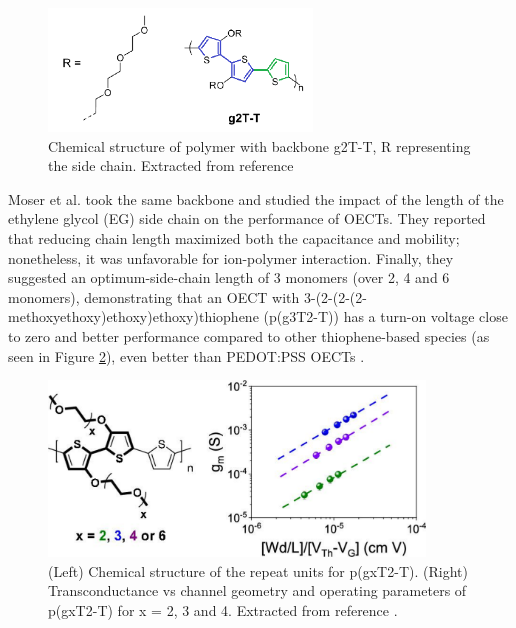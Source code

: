 \begin{figure}[h]
	\centering
	\includegraphics[width=7cm]{Images/pdf/g2T-T.pdf}
	\caption[Chemical structure of polymer g2T-T]{Chemical structure of polymer with backbone g2T-T, R representing the side chain. Extracted from reference \cite{nielsenMolecularDesignSemiconducting2016}}
	\label{fig:g2TT}
\end{figure}

Moser et al. took the same backbone and studied the impact of the length of the ethylene glycol (EG) side chain on the performance of OECTs. They reported that reducing chain length maximized both the capacitance and mobility; nonetheless, it was unfavorable for ion-polymer interaction. Finally, they suggested an optimum-side-chain length of 3 monomers (over 2, 4 and 6 monomers), demonstrating that an OECT with 3-(2-(2-(2-methoxyethoxy)ethoxy)ethoxy)thiophene (p(g3T2-T)) has a turn-on voltage close to zero and better performance compared to other thiophene-based species (as seen in Figure \ref{fig:pg3t}), even better than PEDOT:PSS OECTs %
\cite{moserEthyleneGlycolBasedSide2020}.

\begin{figure}[h]
	\centering
	\includegraphics[width=10cm]{Images/pdf/pg3t+perf.pdf}
	\caption[Chemical structure and transconductance of g2T-T with side-chain engineering]{(Left) Chemical structure of the repeat units for p(gxT2-T). (Right) Transconductance vs channel geometry and operating parameters of p(gxT2-T) for x = 2, 3 and 4. Extracted from reference \cite{moserEthyleneGlycolBasedSide2020}.}
	\label{fig:pg3t}
\end{figure}

